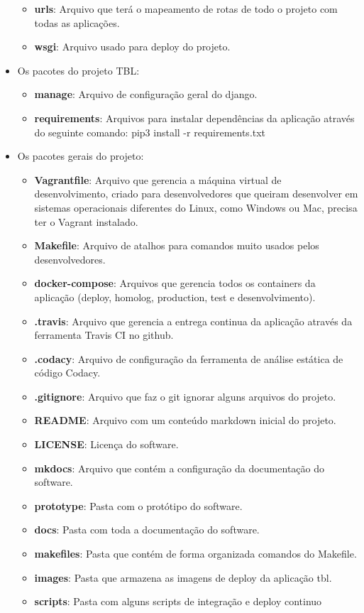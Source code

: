 \begin{itemize}
\begin{itemize}
    \item \textbf{urls}: Arquivo que terá o mapeamento de rotas de todo o projeto com todas as aplicações.
    \item \textbf{wsgi}: Arquivo usado para deploy do projeto.
  \end{itemize}
  \item Os pacotes do projeto TBL:
  \begin{itemize}
    \item \textbf{manage}: Arquivo de configuração geral do django.
    \item \textbf{requirements}: Arquivos para instalar dependências da aplicação através do seguinte comando:
      pip3 install -r requirements.txt
  \end{itemize}
  \item Os pacotes gerais do projeto:
  \begin{itemize}
    \item \textbf{Vagrantfile}: Arquivo que gerencia a máquina virtual de desenvolvimento, criado para desenvolvedores
      que queiram desenvolver em sistemas operacionais diferentes do Linux, como Windows ou Mac, precisa ter o
      Vagrant instalado.
    \item \textbf{Makefile}: Arquivo de atalhos para comandos muito usados pelos desenvolvedores.
    \item \textbf{docker-compose}: Arquivos que gerencia todos os containers da aplicação
      (deploy, homolog, production, test e desenvolvimento).
    \item \textbf{.travis}: Arquivo que gerencia a entrega continua da aplicação através da ferramenta Travis CI no github.
    \item \textbf{.codacy}: Arquivo de configuração da ferramenta de análise estática de código Codacy.
    \item \textbf{.gitignore}: Arquivo que faz o git ignorar alguns arquivos do projeto.
    \item \textbf{README}: Arquivo com um conteúdo markdown inicial do projeto.
    \item \textbf{LICENSE}: Licença do software.
    \item \textbf{mkdocs}: Arquivo que contém a configuração da documentação do software.
    \item \textbf{prototype}: Pasta com o protótipo do software.
    \item \textbf{docs}: Pasta com toda a documentação do software.
    \item \textbf{makefiles}: Pasta que contém de forma organizada comandos do Makefile.
    \item \textbf{images}: Pasta que armazena as imagens de deploy da aplicação tbl.
    \item \textbf{scripts}: Pasta com alguns scripts de integração e deploy continuo
  \end{itemize}
\end{itemize}
